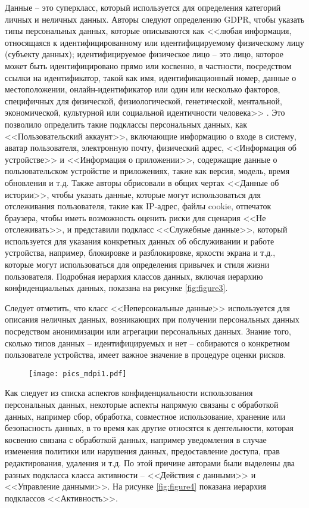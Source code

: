 \documentclass[../main]{subfiles}
\begin{document}
Данные -- это суперкласс, который используется для определения категорий личных и неличных данных. Авторы следуют определению GDPR, чтобы указать типы персональных данных, которые описываются как <<любая информация, относящаяся к идентифицированному или идентифицируемому физическому лицу (субъекту данных); идентифицируемое физическое лицо -- это лицо, которое может быть идентифицировано прямо или косвенно, в частности, посредством ссылки на идентификатор, такой как имя, идентификационный номер, данные о местоположении, онлайн-идентификатор или один или несколько факторов, специфичных для физической, физиологической, генетической, ментальной, экономической, культурной или социальной идентичности человека>> \cite{GDPR, MDPI4}. Это позволило определить такие подклассы персональных данных, как <<Пользовательский аккаунт>>, включающие информацию о входе в систему, аватар пользователя, электронную почту, физический адрес, <<Информация об устройстве>> и <<Информация о приложении>>, содержащие данные о пользовательском устройстве и приложениях, такие как версия, модель, время обновления и т.д. Также авторы обрисовали в общих чертах <<Данные об истории>>, чтобы указать данные, которые могут использоваться для отслеживания пользователя, такие как IP-адрес, файлы cookie, отпечаток браузера, чтобы иметь возможность оценить риски для сценария <<Не отслеживать>>, и представили подкласс <<Служебные данные>>, который используется для указания конкретных данных об обслуживании и работе устройства, например, блокировке и разблокировке, яркости экрана и т.д., которые могут использоваться для определения привычек и стиля жизни пользователя. Подробная иерархия классов данных, включая иерархию конфиденциальных данных, показана на рисунке \ref{fig:figure3}.

Следует отметить, что класс <<Неперсональные данные>> используется для описания неличных данных, возникающих при получении персональных данных посредством анонимизации или агрегации персональных данных. Знание того, сколько типов данных -- идентифицируемых и нет -- собираются о конкретном пользователе устройства, имеет важное значение в процедуре оценки рисков.

\begin{figure}[H]
    \centering
    {\texttt{[image: pics\_mdpi1.pdf]}}
    \vspace{-\baselineskip}
\end{figure}

Как следует из списка аспектов конфиденциальности использования персональных данных, некоторые аспекты напрямую связаны с обработкой данных, например сбор, обработка, совместное использование, хранение или безопасность данных, в то время как другие относятся к деятельности, которая косвенно связана с обработкой данных, например уведомления в случае изменения политики или нарушения данных, предоставление доступа, прав редактирования, удаления и т.д. По этой причине авторами были выделены два разных подкласса класса активности -- <<Действия с данными>> и <<Управление данными>>. На рисунке \ref{fig:figure4} показана иерархия подклассов <<Активность>>. 
\end{document}
